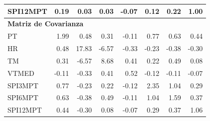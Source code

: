 \begin{table}[ht]
\begin{tabular}{lrrrrrrr}
SPI12MPT & 0.19 & 0.03 & 0.03 & -0.07 & 0.12 & 0.22 & 1.00 \\
\midrule
\multicolumn{8}{l}{\textbf{Matriz de Covarianza}} \\
\midrule
PT       & 1.99 & 0.48 & 0.31 & -0.11 & 0.77 & 0.63 & 0.44 \\
HR       & 0.48 & 17.83 & -6.57 & -0.33 & -0.23 & -0.38 & -0.30 \\
TM       & 0.31 & -6.57 & 8.68 & 0.41 & 0.22 & 0.49 & 0.08 \\
VTMED    & -0.11 & -0.33 & 0.41 & 0.52 & -0.12 & -0.11 & -0.07 \\
SPI3MPT  & 0.77 & -0.23 & 0.22 & -0.12 & 2.35 & 1.04 & 0.29 \\
SPI6MPT  & 0.63 & -0.38 & 0.49 & -0.11 & 1.04 & 1.59 & 0.37 \\
SPI12MPT & 0.44 & -0.30 & 0.08 & -0.07 & 0.29 & 0.37 & 1.06 \\
\bottomrule
\end{tabular}
\end{table}






